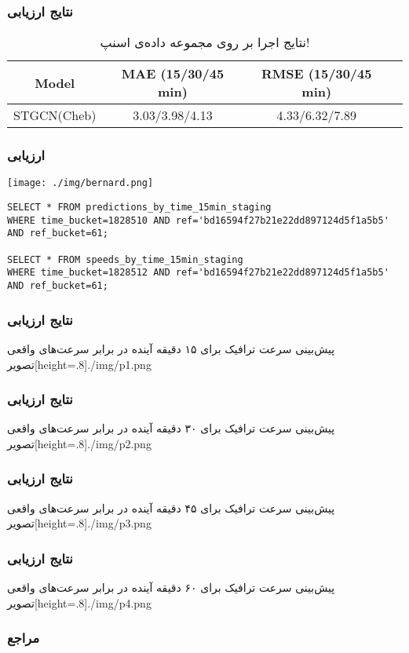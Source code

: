 \documentclass{beamer}
\begin{document}
\begin{frame}
  \frametitle{نتایج ارزیابی}
  \begin{table}[h]
    \centering
    \caption{نتایج اجرا بر روی مجموعه داده‌ی اسنپ!}
    \begin{latin}\begin{tabular}{|c|c|c|c|}
      \hline
      Model & MAE (15/30/45 min) & RMSE (15/30/45 min) \\
      \hline
      STGCN(Cheb) & 3.03/3.98/4.13 & 4.33/6.32/7.89 \\
      \hline
    \end{tabular}\end{latin}
  \end{table}
\end{frame}

\begin{frame}[fragile]
  \frametitle{ارزیابی}
  \texttt{[image: ./img/bernard.png]}
  \scriptsize
  \begin{latin}
    \begin{verbatim}
SELECT * FROM predictions_by_time_15min_staging
WHERE time_bucket=1828510 AND ref='bd16594f27b21e22dd897124d5f1a5b5'
AND ref_bucket=61;

SELECT * FROM speeds_by_time_15min_staging
WHERE time_bucket=1828512 AND ref='bd16594f27b21e22dd897124d5f1a5b5'
AND ref_bucket=61;
    \end{verbatim}
  \end{latin}
\end{frame}

\begin{frame}
  \frametitle{نتایج ارزیابی}
  پیش‌بینی سرعت ترافیک برای ۱۵ دقیقه آینده در برابر سرعت‌های واقعی
  ‌تصویر[height=.8\textheight]{./img/p1.png}
\end{frame}

\begin{frame}
  \frametitle{نتایج ارزیابی}
  پیش‌بینی سرعت ترافیک برای ۳۰ دقیقه آینده در برابر سرعت‌های واقعی
  ‌تصویر[height=.8\textheight]{./img/p2.png}
\end{frame}

\begin{frame}
  \frametitle{نتایج ارزیابی}
  پیش‌بینی سرعت ترافیک برای ۴۵ دقیقه آینده در برابر سرعت‌های واقعی
  ‌تصویر[height=.8\textheight]{./img/p3.png}
\end{frame}

\begin{frame}
  \frametitle{نتایج ارزیابی}
  پیش‌بینی سرعت ترافیک برای ۶۰ دقیقه آینده در برابر سرعت‌های واقعی
  ‌تصویر[height=.8\textheight]{./img/p4.png}
\end{frame}

\begin{frame}[allowframebreaks]
  \frametitle{مراجع}
  \nocite{*}
  \begin{latin}
  \printbibliography[title=مراجع]
  \end{latin}
\end{frame}
\end{document}
